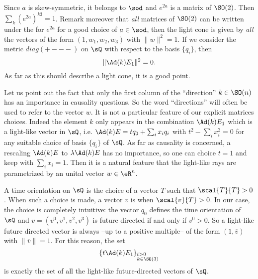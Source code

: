 Since $a$ is skew-symmetric, it belongs to $\sod$ and $e^{2a}$ is a matrix of $\SO(2)$. Then $\sum_k(e^{2a})^{k3}=1$. Remark moreover that \emph{all} matrices of $\SO(2)$ can be written under the for $e^{2a}$ for a good choice of $a\in\sod$, then the light cone is given by \emph{all} the vectors of the form $(1,w_1,w_2,w_3)$ with $\|w\|^2=1$. If we consider the metric $diag(+---)$ on $\sQ$ with respect to the basis $\{q_i\}$, then
\[
  \|\Ad(k)E_1\|^2=0.
\]
As far as this should describe a light cone, it is a good point.

Let us point out the fact that only the first column of the ``direction''{} $k\in \SO(n)$ has an importance in causality questions. So the word ``directions''{} will often be used to refer to the vector $w$. It is not a particular feature of our explicit matrices choices. Indeed the element $k$ only appears in the combination $\Ad(k)E_1$ which is a light-like vector in $\sQ$, i.e. $\Ad(k)E=tq_0+\sum_i x_iq_i$ with $t^2-\sum_i x_i^2=0$ for any suitable choice of basis $\{q_i\}$ of $\sQ$. As far as causality is concerned, a rescaling $\Ad(k)E$ to $\lambda\Ad(k)E$ has no importance, so one can choice $t=1$ and keep with $\sum_i x_i=1$. Then it is a natural feature that the light-like rays are parametrized by an unital vector $w\in\eR^n$.

A time orientation on $\sQ$ is the choice of a vector $T$ such that $\scal{T}{T}>0$. When such a choice is made, a vector $v$ is  when $\scal{v}{T}>0$. In our case, the choice is completely intuitive: the vector $q_0$ defines the time orientation of $\sQ$ and $v=(v^0,v^1,v^2,v^3)$ is future directed if and only if $v^0>0$. So a light-like future directed vector is always --up to a positive multiple-- of the form $(1,\overline{v})$ with $\|\overline{v}\|=1$. For this reason, the set 
\[
  \{t\Ad(k)E_1\}_{%
\begin{subarray}{l}
t>0\\k\in \SO(3) 
\end{subarray}
}
\]
is exactly the set of all the light-like future-directed vectors of $\sQ$.

